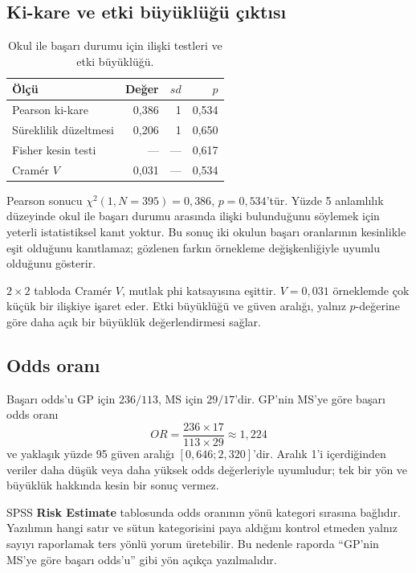 \subsection{Ki-kare ve etki büyüklüğü çıktısı}

\begin{table}[htbp]
\centering
\caption{Okul ile başarı durumu için ilişki testleri ve etki büyüklüğü.}
\begin{tabular}{@{}lrrr@{}}
\toprule
Ölçü & Değer & $sd$ & $p$ \\
\midrule
Pearson ki-kare & 0,386 & 1 & 0,534 \\
Süreklilik düzeltmesi & 0,206 & 1 & 0,650 \\
Fisher kesin testi & --- & --- & 0,617 \\
Cramér $V$ & 0,031 & --- & 0,534 \\
\bottomrule
\end{tabular}
\end{table}

Pearson sonucu $\chi^2(1,N=395)=0{,}386$, $p=0{,}534$'tür. Yüzde 5
anlamlılık düzeyinde okul ile başarı durumu arasında ilişki bulunduğunu
söylemek için yeterli istatistiksel kanıt yoktur. Bu sonuç iki okulun başarı
oranlarının kesinlikle eşit olduğunu kanıtlamaz; gözlenen farkın örnekleme
değişkenliğiyle uyumlu olduğunu gösterir.

$2\times2$ tabloda Cramér $V$, mutlak phi katsayısına eşittir. $V=0{,}031$
örneklemde çok küçük bir ilişkiye işaret eder. Etki büyüklüğü ve güven aralığı,
yalnız $p$-değerine göre daha açık bir büyüklük değerlendirmesi sağlar.

\subsection{Odds oranı}

Başarı odds'u GP için $236/113$, MS için $29/17$'dir. GP'nin MS'ye göre
başarı odds oranı
\[
OR=\frac{236\times17}{113\times29}\approx1{,}224
\]
ve yaklaşık yüzde 95 güven aralığı $[0{,}646;2{,}320]$'dir. Aralık 1'i
içerdiğinden veriler daha düşük veya daha yüksek odds değerleriyle uyumludur;
tek bir yön ve büyüklük hakkında kesin bir sonuç vermez.

SPSS \textbf{Risk Estimate} tablosunda odds oranının yönü kategori sırasına
bağlıdır. Yazılımın hangi satır ve sütun kategorisini paya aldığını kontrol
etmeden yalnız sayıyı raporlamak ters yönlü yorum üretebilir. Bu nedenle
raporda ``GP'nin MS'ye göre başarı odds'u'' gibi yön açıkça yazılmalıdır.

